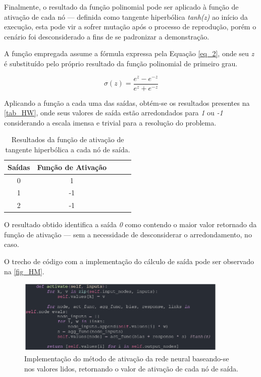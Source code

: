 Finalmente, o resultado da função polinomial pode ser aplicado à função de ativação de cada nó — definida como
tangente hiperbólica \textit{tanh(z)} ao início da execução, esta pode vir a sofrer mutação após o processo de reprodução,
porém o cenário foi desconsiderado a fins de se padronizar a demonstração.

A função empregada assume a fórmula expressa pela Equação \ref{eq_2}, onde seu \textit{z} é substituído pelo próprio resultado da função polinomial de primeiro grau.

\begin{equation}
\label{eq_2}
\sigma(z) = \frac{e^z - e^{-z}}{e^z + e^{-z}}
\end{equation}

Aplicando a função a cada uma das saídas, obtém-se os resultados presentes na \autoref{tab_HW}, onde
seus valores de saída estão arredondados para \textit{1} ou \textit{-1} considerando a escala imensa e trivial para a resolução do problema.

\begin{table}[htb]
	\centering
    \caption{\label{tab_HW}Resultados da função de ativação de tangente hiperbólica a cada nó de saída.}
    \begin{tabular}{ccccc}
        \hline
		\textbf{Sa\'{i}das} & \textbf{Fun\c{c}\~{a}o de Ativa\c{c}\~{a}o} \\ \hline
		0 & 1    \\ \hline
		1 & -1    \\ \hline
		2 & -1  \\ \hline
    \end{tabular}
    
\end{table}

O resultado obtido identifica a saída \textit{0} como contendo o maior valor retornado da função de ativação —
sem a necessidade de desconsiderar o arredondamento, no caso.

O trecho de código com a implementação do cálculo de saída pode ser observado na \autoref{fig_HM}.

\begin{figure}[htb]
        \centering
        \caption{\label{fig_HM}Implementação do método de ativação da rede neural baseando-se nos valores lidos, retornando o valor de ativação de cada nó de saída.}
        \includegraphics[width=0.9\textwidth]{images/HM.png}
\end{figure}

